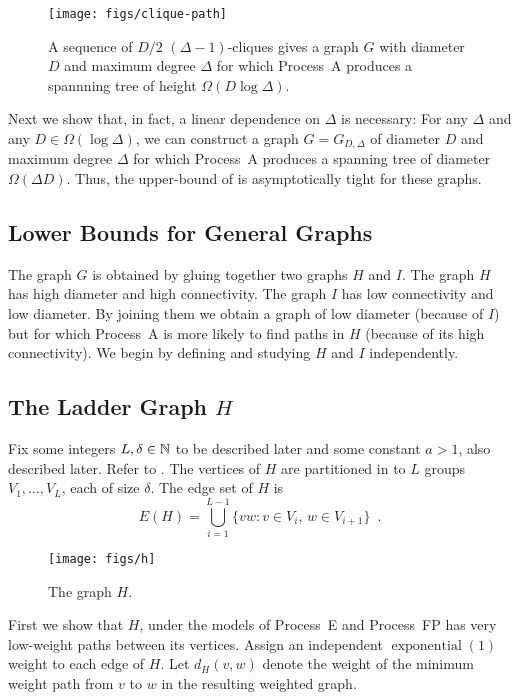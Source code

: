 \documentclass[lotsofwhite]{patmorin}
\DeclareMathOperator{\exponential}{exponential}
\begin{document}
\begin{figure}
  \begin{center}
    \texttt{[image: figs/clique-path]}
  \end{center}
  \caption{A sequence of $D/2$ $(\Delta-1)$-cliques gives a graph $G$
   with diameter $D$ and maximum degree $\Delta$ for which Process~A
   produces a spannning tree of height $\Omega(D\log\Delta)$.}
\end{figure}

Next we show that, in fact, a linear dependence on $\Delta$ is necessary:
For any $\Delta$ and any $D\in\Omega(\log\Delta)$, we can construct a
graph $G=G_{D,\Delta}$ of diameter $D$ and maximum degree $\Delta$ for
which Process~A produces a spanning tree of diameter $\Omega(\Delta D)$.
Thus, the upper-bound of  is asymptotically
tight for these graphs.

\subsection{Lower Bounds for General Graphs}

The graph $G$ is obtained by gluing together two graphs $H$ and $I$.
The graph $H$ has high diameter and high connectivity.  The graph $I$
has low connectivity and low diameter.  By joining them we obtain a graph
of low diameter (because of $I$) but for which Process~A is more likely
to find paths in $H$ (because of its high connectivity).  We begin by
defining and studying $H$ and $I$ independently.


\subsection{The Ladder Graph $H$}

Fix some integers $L,\delta\in\mathbb{N}$ to be described later and some
constant $a>1$, also described later.  Refer to
.  The vertices of $H$ are partitioned in to $L$ groups
$V_1,\ldots,V_L$, each of size $\delta$. The edge set of $H$ is
\[
   E(H) = \bigcup_{i=1}^{L-1} \{vw : v\in V_{i},\, w\in V_{i+1}\} \enspace .
\]
\begin{figure}
  \begin{center}
    \texttt{[image: figs/h]} 
  \end{center}
  \caption{The graph $H$.}
\end{figure}

First we show that $H$, under the models of Process~E and Process~FP
has very low-weight paths between its vertices.
Assign an independent $\exponential(1)$ weight to each edge of $H$.
Let $d_H(v,w)$ denote the weight of the minimum weight path from $v$
to $w$ in the resulting weighted graph.
\end{document}
